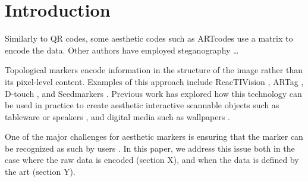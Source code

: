 \section{Introduction}

Similarly to QR codes, some aesthetic codes such as ARTcodes \cite{artcodes} use a matrix to encode the data. Other authors have employed steganography \dots

Topological markers encode information in the structure of the image rather than its pixel-level content. Examples of this approach include ReacTIVision \cite{reactivision}, ARTag \cite{ARTag}, D-touch \cite{dtouch0}\cite{dtouch1}\cite{dtouch2}, and Seedmarkers \cite{seedmarkers}. Previous work has explored how this technology can be used in practice to create aesthetic interactive scannable objects such as tableware \cite{tableware} or speakers \cite{seedmarkers}, and digital media such as wallpapers \cite{interactiveWallpapers}.

One of the major challenges for aesthetic markers is ensuring that the marker can be recognized as such by users \cite{recognizingPresence}. In this paper, we address this issue both in the case where the raw data is encoded (section X), and when the data is defined by the art (section Y).